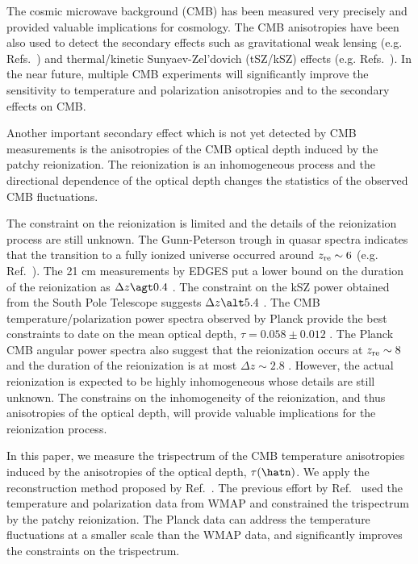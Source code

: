 \documentclass[aps,prd,twocolumn,superscriptaddress,groupedaddress,nofootinbib]{revtex4}
\begin{document}
The cosmic microwave background (CMB) has been measured very precisely and provided valuable implications for cosmology. 
The CMB anisotropies have been also used to detect the secondary effects such as gravitational weak lensing 
(e.g. Refs.~\cite{BKVIII,ACT16:phi,P15:phi,PB14:phi,Story:2014hni}) 
and thermal/kinetic Sunyaev-Zel'dovich (tSZ/kSZ) effects (e.g. Refs.~\cite{George:2014oba,ACTkSZ:2017}). 
In the near future, multiple CMB experiments will significantly improve the sensitivity to 
temperature and polarization anisotropies and to the secondary effects on CMB. 

Another important secondary effect which is not yet detected by CMB measurements is the anisotropies
of the CMB optical depth induced by the patchy reionization. 
The reionization is an inhomogeneous process and the directional dependence of the optical depth 
changes the statistics of the observed CMB fluctuations. 

The constraint on the reionization is limited and the details of the reionization process are still unknown. 
The Gunn-Peterson trough in quasar spectra indicates that the transition to 
a fully ionized universe occurred around $z_{\rm re}\sim 6$ (e.g. Ref.~\cite{Fan:2006dp}). 
The 21 cm measurements by EDGES put a lower bound on the duration of the reionization as 
$\Delta z\agt 0.4$ \cite{Bowman:2012,Monsalve:2017mli}.
The constraint on the kSZ power obtained from the South Pole Telescope suggests $\Delta z\alt 5.4$ \cite{George:2014oba}.
The CMB temperature/polarization power spectra observed by Planck provide the best constraints to date 
on the mean optical depth, $\tau=0.058\pm0.012$ \cite{P16:lowl}.  
The Planck CMB angular power spectra also suggest that the reionization occurs at $z_{\rm re}\sim 8$ and 
the duration of the reionization is at most $\Delta z\sim 2.8$ \cite{P16:reion}. 
However, the actual reionization is expected to be highly inhomogeneous whose details are still unknown. 
The constrains on the inhomogeneity of the reionization, and thus anisotropies of the optical depth, 
will provide valuable implications for the reionization process. 

In this paper, we measure the trispectrum of the CMB temperature anisotropies induced by the anisotropies 
of the optical depth, $\tau(\hatn)$. We apply the reconstruction method proposed by Ref.~\cite{Dvorkin:2008tf}. 
The previous effort by Ref.~\cite{Gluscevic:2012qv} used 
the temperature and polarization data from WMAP and constrained the trispectrum by the patchy reionization. 
The Planck data can address the temperature fluctuations at a smaller scale than the WMAP data, 
and significantly improves the constraints on the trispectrum. 
\end{document}

